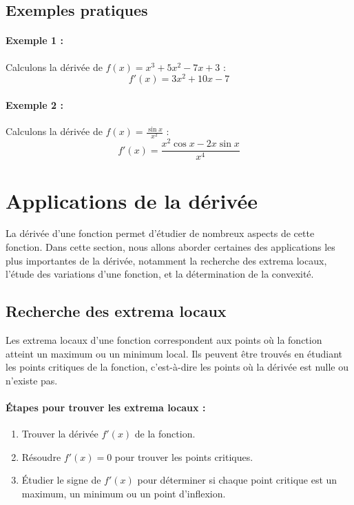 \documentclass{article}
\begin{document}
	\subsection{Exemples pratiques}
	
	\paragraph{Exemple 1 :} Calculons la dérivée de \( f(x) = x^3 + 5x^2 - 7x + 3 \) :
	\[
	f'(x) = 3x^2 + 10x - 7
	\]
	
	\paragraph{Exemple 2 :} Calculons la dérivée de \( f(x) = \frac{\sin x}{x^2} \) :
	\[
	f'(x) = \frac{x^2 \cos x - 2x \sin x}{x^4}
	\]
	

	
	
	\section{Applications de la dérivée}
	
	La dérivée d'une fonction permet d'étudier de nombreux aspects de cette fonction. Dans cette section, nous allons aborder certaines des applications les plus importantes de la dérivée, notamment la recherche des extrema locaux, l'étude des variations d'une fonction, et la détermination de la convexité.
	
	\subsection{Recherche des extrema locaux}
	
	Les extrema locaux d'une fonction correspondent aux points où la fonction atteint un maximum ou un minimum local. Ils peuvent être trouvés en étudiant les points critiques de la fonction, c'est-à-dire les points où la dérivée est nulle ou n'existe pas.
	
	\paragraph{Étapes pour trouver les extrema locaux :}
	\begin{enumerate}
		\item Trouver la dérivée \( f'(x) \) de la fonction.
		\item Résoudre \( f'(x) = 0 \) pour trouver les points critiques.
		\item Étudier le signe de \( f'(x) \) pour déterminer si chaque point critique est un maximum, un minimum ou un point d'inflexion.
	\end{enumerate}
	
\end{document}

